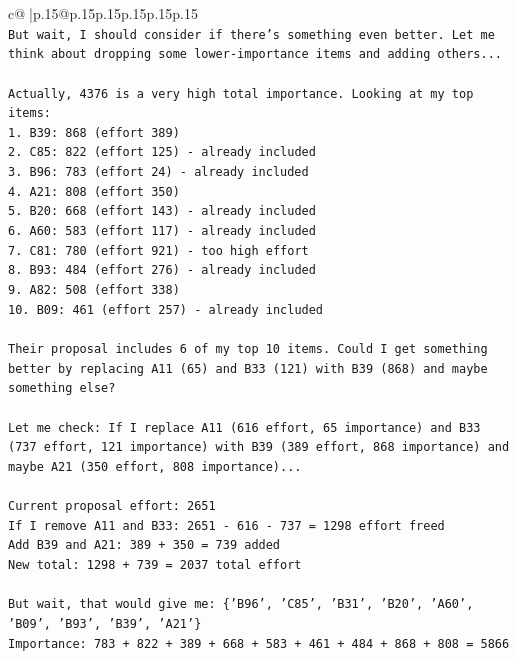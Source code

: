 \documentclass{article}
\begin{document}
{\begin{supertabular}{c@{$\;$}|p{.15\linewidth}@{}p{.15\linewidth}p{.15\linewidth}p{.15\linewidth}p{.15\linewidth}p{.15\linewidth}}
{{{\\ 
\texttt{But wait, I should consider if there's something even better. Let me think about dropping some lower{-}importance items and adding others...} \\
\\ 
\texttt{Actually, 4376 is a very high total importance. Looking at my top items:} \\
\texttt{1. B39: 868 (effort 389)} \\
\texttt{2. C85: 822 (effort 125) {-} already included} \\
\texttt{3. B96: 783 (effort 24) {-} already included} \\
\texttt{4. A21: 808 (effort 350)} \\
\texttt{5. B20: 668 (effort 143) {-} already included} \\
\texttt{6. A60: 583 (effort 117) {-} already included} \\
\texttt{7. C81: 780 (effort 921) {-} too high effort} \\
\texttt{8. B93: 484 (effort 276) {-} already included} \\
\texttt{9. A82: 508 (effort 338)} \\
\texttt{10. B09: 461 (effort 257) {-} already included} \\
\\ 
\texttt{Their proposal includes 6 of my top 10 items. Could I get something better by replacing A11 (65) and B33 (121) with B39 (868) and maybe something else?} \\
\\ 
\texttt{Let me check: If I replace A11 (616 effort, 65 importance) and B33 (737 effort, 121 importance) with B39 (389 effort, 868 importance) and maybe A21 (350 effort, 808 importance)...} \\
\\ 
\texttt{Current proposal effort: 2651} \\
\texttt{If I remove A11 and B33: 2651 {-} 616 {-} 737 = 1298 effort freed} \\
\texttt{Add B39 and A21: 389 + 350 = 739 added} \\
\texttt{New total: 1298 + 739 = 2037 total effort} \\
\\ 
\texttt{But wait, that would give me: \{'B96', 'C85', 'B31', 'B20', 'A60', 'B09', 'B93', 'B39', 'A21'\}} \\
\texttt{Importance: 783 + 822 + 389 + 668 + 583 + 461 + 484 + 868 + 808 = 5866} \\
\\ 
}}}
\end{supertabular}}
\end{document}
